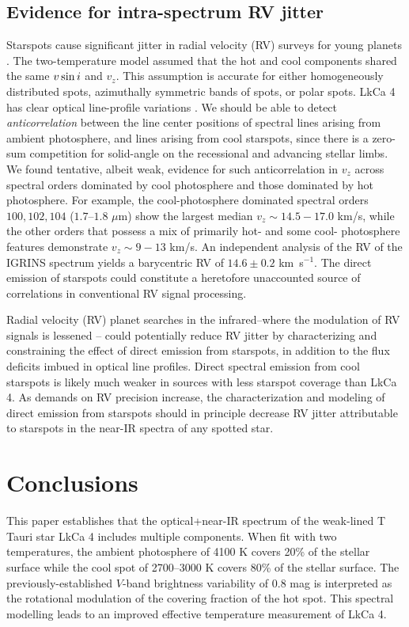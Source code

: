 \documentclass[twocolumn]{emulateapj}%
\begin{document}


\subsection{Evidence for intra-spectrum RV jitter}
Starspots cause significant jitter in radial velocity (RV) surveys for young planets \citep[e.g.][]{donati14, robertson14}.  The two-temperature model assumed that the hot and cool components shared the same $v \sin i$ and $v_z$.  This assumption is accurate for either homogeneously distributed spots, azimuthally symmetric bands of spots, or polar spots.  LkCa 4 has clear optical line-profile variations \citep{nguyen12, donati14}.  We should be able to detect \emph{anticorrelation} between the line center positions of spectral lines arising from ambient photosphere, and lines arising from cool starspots, since there is a zero-sum competition for solid-angle on the recessional and advancing stellar limbs.  We found tentative, albeit weak, evidence for such anticorrelation in $v_z$ across spectral orders dominated by cool photosphere and those dominated by hot photosphere.  For example, the cool-photosphere dominated spectral orders $100, 102, 104$ ($1.7$--$1.8$ $\mu$m) show the largest median $v_z\sim14.5-17.0$ km/s, while the other orders that possess a mix of primarily hot- and some cool- photosphere features demonstrate $v_z\sim9-13$ km/s.  An independent analysis of the RV of the IGRINS spectrum yields a barycentric RV of $14.6\pm0.2$ km~s$^{-1}$.  The direct emission of starspots could constitute a heretofore unaccounted source of correlations in conventional RV signal processing.

Radial velocity (RV) planet searches in the infrared--where the modulation of RV signals is lessened \citep[\emph{e.g.}][]{prato08}-- could potentially reduce RV jitter by characterizing and constraining the effect of direct emission from starspots, in addition to the flux deficits imbued in optical line profiles.  Direct spectral emission from cool starspots is likely much weaker in sources with less starspot coverage than LkCa 4.  As demands on RV precision increase, the characterization and modeling of direct emission from starspots should in principle decrease RV jitter attributable to starspots in the near-IR spectra of any spotted star.


\section{Conclusions}
This paper establishes that the optical+near-IR spectrum of the weak-lined T Tauri star LkCa 4 includes multiple components.  When fit with two temperatures, the ambient photosphere of 4100 K covers 20\% of the stellar surface while the cool spot of 2700--3000 K covers 80\% of the stellar surface.  The previously-established $V$-band brightness variability of $0.8$ mag is interpreted as the rotational modulation of the covering fraction of the hot spot.  This spectral modelling leads to an improved effective temperature measurement of LkCa 4.
\end{document}
